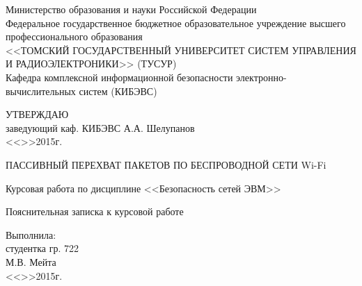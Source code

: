 \newpage
{}

\begin{center}
 Министерство образования и науки Российской Федерации\\
 Федеральное государственное бюджетное образовательное учреждение высшего профессионального образования\\
 <<ТОМСКИЙ ГОСУДАРСТВЕННЫЙ УНИВЕРСИТЕТ СИСТЕМ УПРАВЛЕНИЯ И РАДИОЭЛЕКТРОНИКИ>> (ТУСУР)\\
 Кафедра комплексной информационной безопасности электронно-вычислительных систем (КИБЭВС)\\
\end{center}

\vfill

\begin{flushright}
\begin{minipage}{0.45\textwidth}
 \begin{flushleft}
  УТВЕРЖДАЮ\\
  заведующий каф. КИБЭВС
  \underline{\hspace{3cm}}А.А. Шелупанов \\
  <<\underline{\hspace{1cm}}>>\underline{\hspace{3cm}}2015г.\\
 \end{flushleft}
\end{minipage}
\end{flushright}

\vfill

\begin{center}
ПАССИВНЫЙ ПЕРЕХВАТ ПАКЕТОВ ПО БЕСПРОВОДНОЙ СЕТИ Wi-Fi

Курсовая работа по дисциплине <<Безопасность сетей ЭВМ>>

Пояснительная записка к курсовой работе
\end{center}

\vfill
\begin{flushright}
\begin{minipage}{0.45\textwidth}
 \begin{flushleft}
  Выполнила: \\
  студентка гр. 722 \\
  \underline{\hspace{3cm}}М.В. Мейта \\
  <<\underline{\hspace{1cm}}>>\underline{\hspace{3cm}}2015г.\\
 \end{flushleft}
\end{minipage}
\end{flushright}

